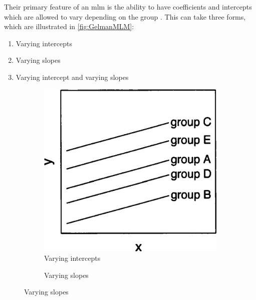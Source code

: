 Their primary feature of an \gls{mlm} is the ability to have coefficients and intercepts which are allowed to vary depending on the group \citep{DataAnalysisUsingGelman}. This can take three forms, which are illustrated in \cref{fig:GelmanMLM}:

\begin{enumerate}
  \item Varying intercepts
  \item Varying slopes
  \item Varying intercept and varying slopes
\end{enumerate}

\begin{figure}[h]
  \centering
  \begin{subfigure}[b]{.3\textwidth}
    \centering
    \caption{Varying intercepts}
    \includegraphics[width=\textwidth]{Figures/GelmanMLMa.jpg}    
  \end{subfigure}
\hfill
  \begin{subfigure}[b]{.3\textwidth}
    \centering
    \caption{Varying slopes}

\end{subfigure}
\end{figure}

